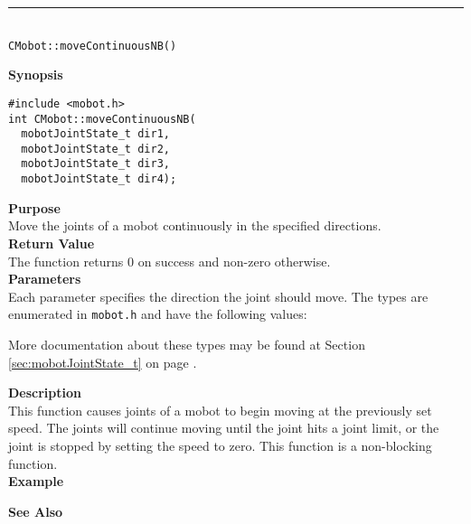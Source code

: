 \noindent
\vspace{5pt}
\rule{4.5in}{0.015in}\\
\noindent
{\LARGE \texttt{CMobot::moveContinuousNB()}}\\
{}

\noindent
{\bf Synopsis}
\vspace{-8pt}
\begin{verbatim}
#include <mobot.h>
int CMobot::moveContinuousNB(
  mobotJointState_t dir1, 
  mobotJointState_t dir2, 
  mobotJointState_t dir3, 
  mobotJointState_t dir4);
\end{verbatim}

\noindent
{\bf Purpose}\\
Move the joints of a mobot continuously in the specified directions.\\

\noindent
{\bf Return Value}\\
The function returns 0 on success and non-zero otherwise.\\

\noindent
{\bf Parameters}\\
Each parameter specifies the direction the joint should move. The types
are enumerated in \texttt{mobot.h} and have the following values:

More documentation about these types may be found at Section
\ref{sec:mobotJointState_t} on page
\pageref{sec:mobotJointState_t}.

\noindent
{\bf Description}\\
This function causes joints of a mobot to begin moving at the previously set
speed. The joints will continue moving until the joint hits a joint limit, or
the joint is stopped by setting the speed to zero. This function is a non-blocking
function.\\

\noindent
{\bf Example}\\
\noindent

\noindent
{\bf See Also}\\


